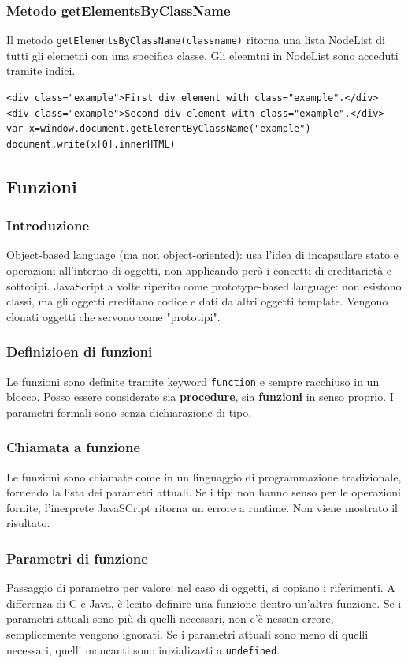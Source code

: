 \documentclass{article}
\begin{document}
\subsubsection{Metodo getElementsByClassName}
Il metodo \texttt{getElementsByClassName(classname)} ritorna una lista NodeList di tutti gli elemetni con una specifica classe. Gli eleemtni in
NodeList sono acceduti tramite indici.
\begin{lstlisting}[style=htmlstyle]
<div class="example">First div element with class="example".</div>
<div class="example">Second div element with class="example".</div>
var x=window.document.getElementByClassName("example")
document.write(x[0].innerHTML)
\end{lstlisting}
\subsection{Funzioni}
\subsubsection{Introduzione}
Object-based language (ma non object-oriented): usa l'idea di incapsulare stato e operazioni all'interno di oggetti, non applicando però i concetti di
ereditarietà e sottotipi. JavaScript a volte riperito come prototype-based language: non esistono classi, ma gli oggetti ereditano codice e dati da altri oggetti template.
Vengono clonati oggetti che servono come "prototipi".
\subsubsection{Definizioen di funzioni}
Le funzioni sono definite tramite keyword \texttt{function} e sempre racchiuso in un blocco. Posso essere considerate sia \textbf{procedure}, sia \textbf{funzioni} in senso proprio.
I parametri formali sono senza dichiarazione di tipo.
\subsubsection{Chiamata a funzione}
Le funzioni sono chiamate come in un linguaggio di programmazione tradizionale, fornendo la lista dei parametri attuali. Se i tipi non hanno senso per le operazioni fornite, l'inerprete
JavaSCript ritorna un errore a runtime. Non viene mostrato il risultato.
\subsubsection{Parametri di funzione}
Passaggio di parametro per valore: nel caso di oggetti, si copiano i riferimenti. A differenza di C e Java, è lecito definire una funzione dentro un'altra funzione. Se i parametri attuali sono
più di quelli necessari, non c'è nessun errore, semplicemente vengono ignorati. Se i parametri attuali sono meno di quelli necessari, quelli mancanti sono inizializazti a \texttt{undefined}.
\end{document}
